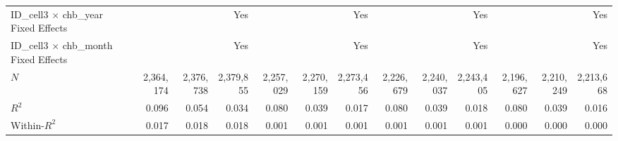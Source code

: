 \begin{tabular}{lrrrrrrrrrrrr}
ID\_cell3 $\times$ chb\_year Fixed Effects  &              &              &          Yes &              &              &          Yes &              &              &          Yes &              &              &          Yes \\ 
ID\_cell3 $\times$ chb\_month Fixed Effects &              &              &          Yes &              &              &          Yes &              &              &          Yes &              &              &          Yes \\ 
\midrule
$N$                                         &    2,364,174 &    2,376,738 &    2,379,855 &    2,257,029 &    2,270,159 &    2,273,456 &    2,226,679 &    2,240,037 &    2,243,405 &    2,196,627 &    2,210,249 &    2,213,668 \\ 
$R^2$                                       &        0.096 &        0.054 &        0.034 &        0.080 &        0.039 &        0.017 &        0.080 &        0.039 &        0.018 &        0.080 &        0.039 &        0.016 \\ 
Within-$R^2$                                &        0.017 &        0.018 &        0.018 &        0.001 &        0.001 &        0.001 &        0.001 &        0.001 &        0.001 &        0.000 &        0.000 &        0.000 \\ 
\bottomrule
\end{tabular}
